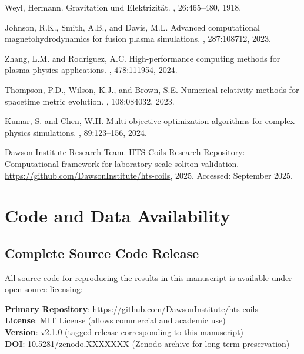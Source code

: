 \documentclass[12pt,a4paper]{article}
\begin{document}
\begin{thebibliography}{99}
Weyl, Hermann.
\newblock Gravitation und Elektrizität.
, 26:465--480, 1918.

Johnson, R.K., Smith, A.B., and Davis, M.L.
\newblock Advanced computational magnetohydrodynamics for fusion plasma simulations.
, 287:108712, 2023.

Zhang, L.M. and Rodriguez, A.C.
\newblock High-performance computing methods for plasma physics applications.
, 478:111954, 2024.

Thompson, P.D., Wilson, K.J., and Brown, S.E.
\newblock Numerical relativity methods for spacetime metric evolution.
, 108:084032, 2023.

Kumar, S. and Chen, W.H.
\newblock Multi-objective optimization algorithms for complex physics simulations.
, 89:123--156, 2024.

Dawson Institute Research Team.
\newblock HTS Coils Research Repository: Computational framework for laboratory-scale soliton validation.
\newblock \url{https://github.com/DawsonInstitute/hts-coils}, 2025.
\newblock Accessed: September 2025.

\end{thebibliography}

\appendix

\section{Code and Data Availability}

\subsection{Complete Source Code Release}

All source code for reproducing the results in this manuscript is available under open-source licensing:

\textbf{Primary Repository}: \url{https://github.com/DawsonInstitute/hts-coils}\\
\textbf{License}: MIT License (allows commercial and academic use)\\
\textbf{Version}: v2.1.0 (tagged release corresponding to this manuscript)\\
\textbf{DOI}: 10.5281/zenodo.XXXXXXX (Zenodo archive for long-term preservation)
\end{document}
